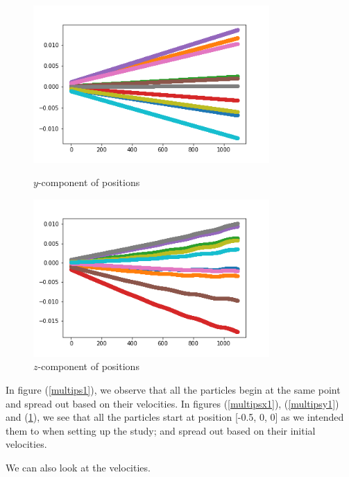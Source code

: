 \documentclass[12pt]{article}
\begin{document}
	\begin{figure}[H]
		\begin{multicols}{2}
			\includegraphics[width=\linewidth, height=6cm]{multipsy1.png} \caption{$y$-component of positions} \label{multipsy1} \par
			\includegraphics[width=\linewidth, height=6cm]{multipsz1.png} \caption{$z$-component of positions} \label{multipsz1} \par
		\end{multicols}
	\end{figure}
	
	In figure (\ref{multips1}), we observe that all the particles begin at the same point and spread out based on their velocities. In figures (\ref{multipsx1}), (\ref{multipsy1}) and (\ref{multipsz1}), we see that all the particles start at position [-0.5, 0, 0] as we intended them to when setting up the study; and spread out based on their initial velocities.
	
	We can also look at the velocities.
	
\end{document}
